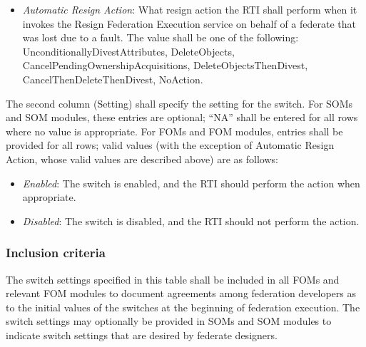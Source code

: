\newpage
\begin{itemize}[topsep=0pt,itemsep=2pt]
\item \textit{Automatic Resign Action}: What resign action the RTI shall perform when it invokes the Resign Federation Execution service on behalf of a federate that was lost due to a fault. The value shall be one of the following: UnconditionallyDivestAttributes, DeleteObjects, CancelPendingOwnershipAcquisitions, DeleteObjectsThenDivest, CancelThenDeleteThenDivest, NoAction.
\end{itemize}

The second column (Setting) shall specify the setting for the switch. For SOMs and SOM modules, these entries are optional; ``NA'' shall be entered for all rows where no value is appropriate. For FOMs and FOM modules, entries shall be provided for all rows; valid values (with the exception of Automatic Resign Action, whose valid values are described above) are as follows:
\begin{itemize}[topsep=1pt,itemsep=2pt]
\item \textit{Enabled}: The switch is enabled, and the RTI should perform the action when appropriate.
\item \textit{Disabled}: The switch is disabled, and the RTI should not perform the action.
\end{itemize}

\subsubsection{Inclusion criteria}
The switch settings specified in this table shall be included in all FOMs and relevant FOM modules to document agreements among federation developers as to the initial values of the switches at the beginning of federation execution. The switch settings may optionally be provided in SOMs and SOM modules to indicate switch settings that are desired by federate designers.

